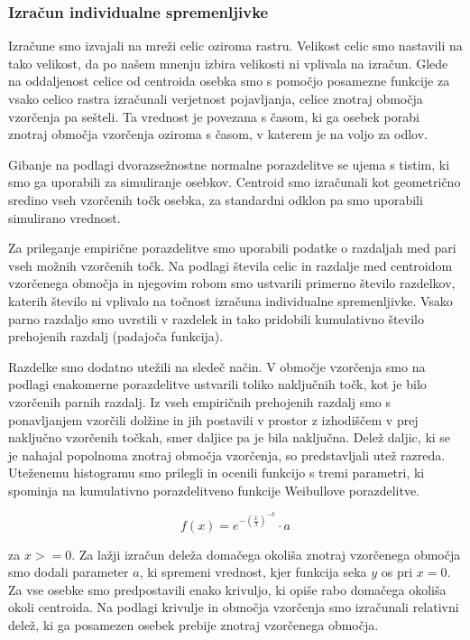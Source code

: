 \subsubsection{Izračun individualne spremenljivke}
Izračune smo izvajali na mreži celic oziroma rastru. Velikost celic smo nastavili na tako velikost, da po našem mnenju izbira velikosti ni vplivala na izračun. Glede na oddaljenost celice od centroida osebka smo s pomočjo posamezne funkcije za vsako celico rastra izračunali verjetnost pojavljanja, celice znotraj območja vzorčenja pa sešteli. Ta vrednost je povezana s časom, ki ga osebek porabi znotraj območja vzorčenja oziroma s časom, v katerem je na voljo za odlov.

Gibanje na podlagi dvorazsežnostne normalne porazdelitve se ujema s tistim, ki smo ga uporabili za simuliranje osebkov. Centroid smo izračunali kot geometrično sredino vseh vzorčenih točk osebka, za standardni odklon pa smo uporabili simulirano vrednost.

Za prileganje empirične porazdelitve smo uporabili podatke o razdaljah med pari vseh možnih vzorčenih točk. Na podlagi števila celic in razdalje med centroidom vzorčenega območja in njegovim robom smo ustvarili primerno število razdelkov, katerih število ni vplivalo na točnost izračuna individualne spremenljivke. Vsako parno razdaljo smo uvrstili v razdelek in tako pridobili kumulativno število prehojenih razdalj (padajoča funkcija).

Razdelke smo dodatno utežili na sledeč način. V območje vzorčenja smo na podlagi enakomerne porazdelitve ustvarili toliko naključnih točk, kot je bilo vzorčenih parnih razdalj. Iz vseh empiričnih prehojenih razdalj smo s ponavljanjem vzorčili dolžine in jih postavili v prostor z izhodiščem v prej naključno vzorčenih točkah, smer daljice pa je bila naključna. Delež daljic, ki se je nahajal popolnoma znotraj območja vzorčenja, so predstavljali utež razreda. Uteženemu histogramu smo prilegli in ocenili funkcijo s tremi parametri, ki spominja na kumulativno porazdelitveno funkcije Weibullove porazdelitve.

\[
f(x) = e^{-(\frac{x}{\lambda})^{-k}}  \cdot a
\]

za $x >= 0$. Za lažji izračun deleža domačega okoliša znotraj vzorčenega območja smo dodali parameter $a$, ki spremeni vrednost, kjer funkcija seka $y$ os pri $x = 0$.
Za vse osebke smo predpostavili enako krivuljo, ki opiše rabo domačega okoliša okoli centroida. Na podlagi krivulje in območja vzorčenja smo izračunali relativni delež, ki ga posamezen osebek prebije znotraj vzorčenega območja.

